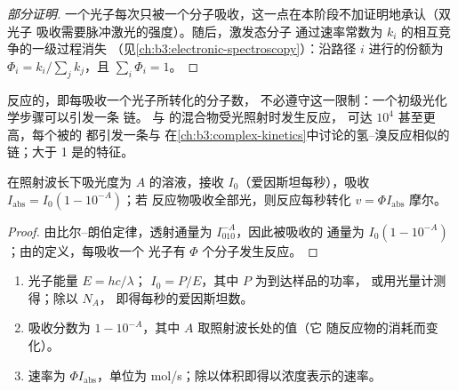 \begin{proof}[部分证明]
一个光子每次只被一个分子吸收，这一点在本阶段不加证明地承认（双光子
吸收需要脉冲激光的强度）。随后，激发态分子
通过速率常数为 $k_i$ 的相互竞争的一级过程消失
（见\cref{ch:b3:electronic-spectroscopy}）：沿路径 $i$ 进行的份额为 $\Phi_i =
k_i/\sum_jk_j$，且 $\sum_i\Phi_i = 1$。
\end{proof}

反应的，即每吸收一个光子所转化的分子数，
不必遵守这一限制：一个初级光化学步骤可以引发一条
链。 与  的混合物受光照射时发生反应，
可达 $10^4$ 甚至更高，每个被的  都引发一条与
在\cref{ch:b3:complex-kinetics}中讨论的氢–溴反应相似的链；大于 1
是的特征。

\begin{proposition}[光化学反应的速率]\label{prop:b3:photochemistry:rate}
在照射波长下吸光度为 $A$ 的溶液，接收 $I_0$（爱因斯坦每秒），吸收 $I_{\mathrm{abs}} = I_0(1 - 10^{-A})$；若
反应物吸收全部光，则反应每秒转化 $v = \Phi I_{\mathrm{abs}}$ 摩尔。
\end{proposition}

\begin{proof}
由比尔–朗伯定律，透射通量为 $I_010^{-A}$，因此被吸收的
通量为 $I_0(1 - 10^{-A})$；由的定义，每吸收一个
光子有 $\Phi$ 个分子发生反应。
\end{proof}

\begin{method}[由光源确定光化学反应的速率]\label{met:b3:photochemistry:photochemical-rate}
\begin{enumerate}
  \item 光子能量 $E = hc/\lambda$； $I_0 = P/E$，其中 $P$ 为到达样品的功率，
        或用光量计测得；除以 $N_A$，
        即得每秒的爱因斯坦数。
  \item 吸收分数为 $1 - 10^{-A}$，其中 $A$ 取照射波长处的值（它
        随反应物的消耗而变化）。
  \item 速率为 $\Phi I_{\mathrm{abs}}$，单位为 mol/s；除以体积即得以浓度表示的速率。
\end{enumerate}
\end{method}

